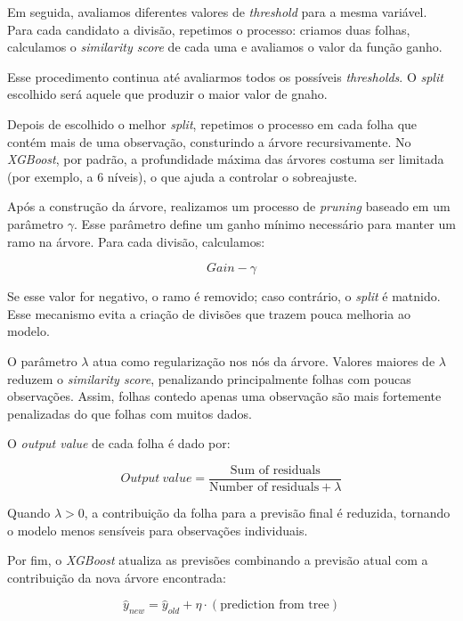 \documentclass{article}
\begin{document}
Em seguida, avaliamos diferentes valores de \textit{threshold} para a 
mesma variável. Para cada candidato a divisão, repetimos o processo: 
criamos duas folhas, calculamos o \textit{similarity score} de cada uma 
e avaliamos o valor da função ganho.

Esse procedimento continua até avaliarmos todos os possíveis \textit{thresholds}.
O \textit{split} escolhido será aquele que produzir o maior valor de gnaho.

Depois de escolhido o melhor \textit{split}, repetimos o processo em cada 
folha que contém mais de uma observação, consturindo a árvore recursivamente.
No \textit{XGBoost}, por padrão, a profundidade máxima das árvores costuma 
ser limitada (por exemplo, a 6 níveis), o que ajuda a controlar o sobreajuste.

Após a construção da árvore, realizamos um processo de \textit{pruning} baseado 
em um parâmetro $\gamma$. Esse parâmetro define um ganho mínimo necessário 
para manter um ramo na árvore. Para cada divisão, calculamos:

\begin{equation}
    Gain - \gamma
\end{equation}

Se esse valor for negativo, o ramo é removido; caso contrário, o \textit{split}
é matnido. Esse mecanismo evita a criação de divisões que trazem pouca melhoria
ao modelo.

O parâmetro $\lambda$ atua como regularização nos nós da árvore. Valores maiores 
de $\lambda$ reduzem o \textit{similarity score}, penalizando principalmente folhas
com poucas observações. Assim, folhas contedo apenas uma observação são mais 
fortemente penalizadas do que folhas com muitos dados.

O \textit{output value} de cada folha é dado por:

\begin{equation}
    Output\ value =
    \frac{\text{Sum of residuals}}
    {\text{Number of residuals} + \lambda}
\end{equation}

Quando $\lambda > 0$, a contribuição da folha para a previsão final é 
reduzida, tornando o modelo menos sensíveis para observações individuais.

Por fim, o \textit{XGBoost} atualiza as previsões combinando a previsão
atual com a contribuição da nova árvore encontrada:

\begin{equation}
    \hat{y}_{new} =
    \hat{y}_{old} +
    \eta \cdot (\text{prediction from tree})
\end{equation}
\end{document}

